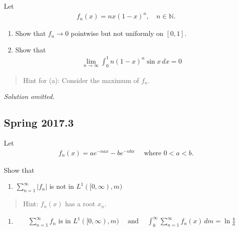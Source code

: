 Let
\begin{align*}
f_{n}(x) = n x(1-x)^{n}, \quad n \in {\mathbb{N}}.
\end{align*}

\begin{enumerate}
\def\labelenumi{\alph{enumi}.}
\item
  Show that \(f_n \to 0\) pointwise but not uniformly on \([0, 1]\).
\item
  Show that
  \begin{align*}
  \lim _{n \to \infty} \int _{0}^{1} n(1-x)^{n} \sin x \, dx = 0
  \end{align*}
\end{enumerate}

\begin{quote}
Hint for (a): Consider the maximum of \(f_n\).
\end{quote}

\emph{Solution omitted.}

\hypertarget{spring-2017.3}{%
\subsection{Spring 2017.3}\label{spring-2017.3}}

Let
\begin{align*}
f_{n}(x) = a e^{-n a x} - b e^{-n b x} \quad \text{ where } 0 < a < b.
\end{align*}

Show that

\begin{enumerate}
\def\labelenumi{\alph{enumi}.}
\tightlist
\item
  \(\sum_{n=1}^{\infty} \left|f_{n}\right|\) is not in
  \(L^{1}([0, \infty), m)\)
\end{enumerate}

\begin{quote}
Hint: \(f_n(x)\) has a root \(x_n\).
\end{quote}

\begin{enumerate}
\def\labelenumi{\alph{enumi}.}
\setcounter{enumi}{1}
\tightlist
\item

  \begin{align*}
  \sum_{n=1}^{\infty} f_{n} \text { is in } L^{1}([0, \infty), m) 
  {\quad \operatorname{and} \quad}
  \int _{0}^{\infty} \sum _{n=1}^{\infty} f_{n}(x) \,dm = \ln \frac{b}{a}
  \end{align*}
   
\end{enumerate}


